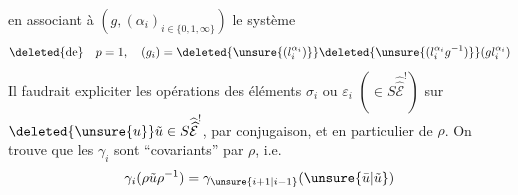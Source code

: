en associant à $(g,(\alpha_i)_{i\in\{0,1,\infty\}})$ le système
\[
\deleted{\text{de}}\quad p=1,\quad(g_i)=\deleted{\unsure{(l_i^{\alpha_i})}}\deleted{\unsure{(l_i^{\alpha_i}g^{-1})}}(gl_i^{\alpha_i})
\]
Il faudrait expliciter les opérations des éléments $\sigma_i$ ou $\varepsilon_i$  $(\in S\widehat{\widehat{\mathcal E}}^!)$ sur $\deleted{\unsure{u}}\tilde u\in S\widehat{\widehat{\mathcal E}}^!$, par  conjugaison, et en particulier de $\rho$. On trouve que  les $\gamma_i$ sont ``covariants'' par $\rho$, i.e.
\[
\gamma_i(\rho\tilde u\rho^{-1})=\gamma_{\unsure{i+1|i-1}}(\unsure{\bar u|\tilde u})
\]
